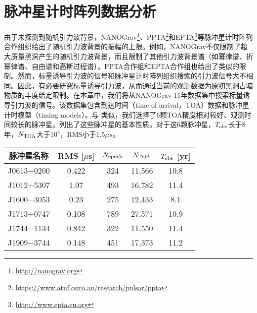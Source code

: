 \section{脉冲星计时阵列数据分析}
由于未探测到随机引力波背景，NANOGrav\footnote{\url{http://nanograv.org}}、PPTA\footnote{\url{https://www.atnf.csiro.au/research/pulsar/ppta}}和EPTA\footnote{\url{http://www.epta.eu.org}}等脉冲星计时阵列合作组织给出了随机引力波背景的振幅的上限。例如，NANOGrav不仅限制了超大质量黑洞产生的随机引力波背景，而且限制了其他引力波背景谱（如幂律谱、折幂律谱、自由谱和高斯过程谱\cite{Arzoumanian:2018saf}）。PPTA合作组\cite{Shannon:2013wma}和EPTA合作组\cite{vanHaasteren:2011ni}也给出了类似的限制。然而，标量诱导引力波的信号和脉冲星计时阵列组织搜索的引力波信号大不相同。因此，有必要研究标量诱导引力波，从而通过当前的观测数据为原初黑洞占暗物质的丰度给定限制。在本章中，我们将从NANOGrav 11年数据集中搜索标量诱导引力波的信号。该数据集包含到达时间（time of arrival，TOA）数据和脉冲星计时模型（timing models）\cite{Arzoumanian:2017puf}。与 \cite{Kato:2019bqz}类似，我们选择了6颗TOA精度相对较好、观测时间较长的脉冲星。列出了这些脉冲星的基本性质。对于这6颗脉冲星，$T_{\rm{obs}}$长于$8$年，$N_{\rm{TOA}}$大于$10^4$，RMS小于$1.5\mu s$。
\begin{table}[htb]
    \begin{center}
    \begin{tabular}{ccccc}
        \hline\hline
        脉冲星名称\hspace{1mm} & RMS [$\mu$s]\hspace{1mm} & $N_{\rm{epoch}}$\hspace{1mm} & $N_{\rm{TOA}}$\hspace{1mm} & $T_{\rm{obs}}$ [yr] \\
        \hline    
        J0613$-$0200 & 0.422 & 324 & 11,566 & 10.8  \\
        J1012$+$5307 & 1.07 & 493 & 16,782 & 11.4  \\
        J1600$-$3053 & 0.23 & 275 & 12,433 & 8.1  \\
        J1713$+$0747 & 0.108 & 789 & 27,571 & 10.9  \\
        J1744$-$1134 & 0.842 & 322 & 11,550 & 11.4  \\
        J1909$-$3744 & 0.148 & 451 & 17,373 & 11.2  \\    
        \hline \hline
    \end{tabular}
\label{pulsars}
    \end{center}
\end{table}


